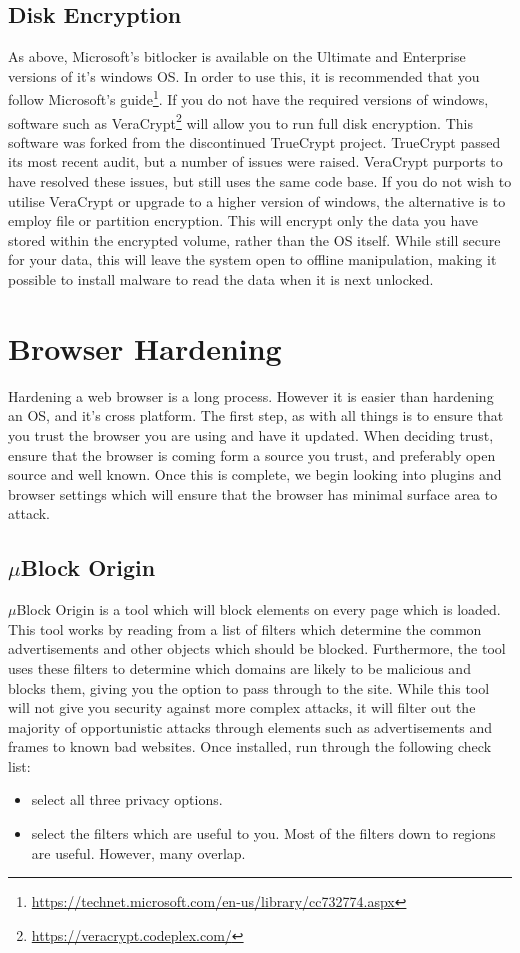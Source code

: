 \documentclass[a4paper,11pt]{report}
\begin{document}
		\subsection{Disk Encryption}
			As above, Microsoft's bitlocker is available on the Ultimate and Enterprise versions of it's windows OS.
			In order to use this, it is recommended that you follow Microsoft's guide\footnote{\url{https://technet.microsoft.com/en-us/library/cc732774.aspx}}. 
			If you do not have the required versions of windows, software such as VeraCrypt\footnote{\url{https://veracrypt.codeplex.com/}} will allow you to run full disk encryption. 
			This software was forked from the discontinued TrueCrypt project. 
			TrueCrypt passed its most recent audit, but a number of issues were raised.
			VeraCrypt purports to have resolved these issues, but still uses the same code base. 
			If you do not wish to utilise VeraCrypt or upgrade to a higher version of windows, the alternative is to employ file or partition encryption. 
			This will encrypt only the data you have stored within the encrypted volume, rather than the OS itself. 
			While still secure for your data, this will leave the system open to offline manipulation,
			making it possible to install malware to read the data when it is next unlocked. 
	\section{Browser Hardening}
		Hardening a web browser is a long process. However it is easier than hardening an OS, and it's cross platform. 
		The first step, as with all things is to ensure that you trust the browser you are using and have it updated. 
		When deciding trust, ensure that the browser is coming form a source you trust, and preferably open source and well known. 
		Once this is complete, we begin looking into plugins and browser settings which will ensure that the browser has minimal surface area to attack. 
		\subsection{$\mu{}$Block Origin}
			$\mu$Block Origin is a tool which will block elements on every page which is loaded. 
			This tool works by reading from a list of filters which determine the common advertisements and other objects which should be blocked. 
			Furthermore, the tool uses these filters to determine which domains are likely to be malicious and blocks them, giving you the option to pass through to the site. 
			While this tool will not give you security against more complex attacks, it will filter out the majority of opportunistic attacks through elements such as advertisements and frames to known bad websites. 
			Once installed, run through the following check list: 
			\begin{itemize}
				\item select all three privacy options.
				\item select the filters which are useful to you. 
					Most of the filters down to regions are useful. However, many overlap. 
			\end{itemize}
\end{document}

